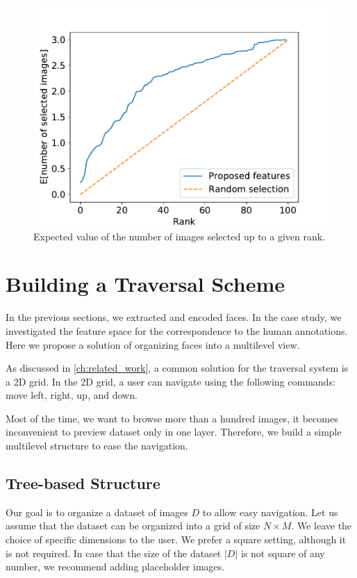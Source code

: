 \begin{figure}
    \centering
    \includegraphics[width=0.8\linewidth]{graphs/survey_cumsum_without_the_easy.pdf}
    \caption{Expected value of the number of images selected up to a given rank.}
    \label{fig:cumsum_faces}
\end{figure}

\section{Building a Traversal Scheme}

In the previous sections, we extracted and encoded faces. In the case study, we investigated the feature space for the correspondence to the human annotations. Here we propose a solution of organizing faces into a multilevel view. 

As discussed in \autoref{ch:related_work}, a common solution for the traversal system is a 2D grid.  In the 2D grid, a user can navigate using the following commands: move left, right, up, and down.

Most of the time, we want to browse more than a hundred images, it becomes inconvenient to preview dataset only in one layer. Therefore, we build a simple multilevel structure to ease the navigation.

\subsection{Tree-based Structure}

Our goal is to organize a dataset of images $D$ to allow easy navigation. Let us assume that the dataset can be organized into a grid of size $N\times M$. We leave the choice of specific dimensions to the user. We prefer a square setting, although it is not required. In case that the size of the dataset $|D|$ is not square of any number, we recommend adding placeholder images.

